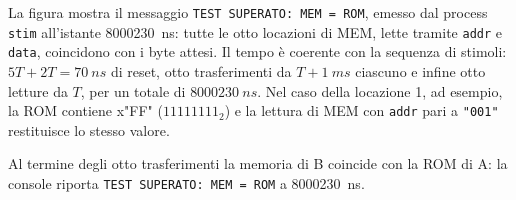 La figura mostra il messaggio \texttt{TEST SUPERATO: MEM = ROM}, emesso dal process \texttt{stim} all'istante \SI{8000230}{ns}: tutte le otto locazioni di MEM, lette tramite \texttt{addr} e \texttt{data}, coincidono con i byte attesi. Il tempo è coerente con la sequenza di stimoli: $5T + 2T = \SI{70}{ns}$ di reset, otto trasferimenti da $T + \SI{1}{ms}$ ciascuno e infine otto letture da $T$, per un totale di $\SI{8000230}{ns}$. Nel caso della locazione 1, ad esempio, la ROM contiene x"FF" ($11111111_2$) e la lettura di MEM con \texttt{addr} pari a \texttt{"001"} restituisce lo stesso valore.

\begin{risultato}
Al termine degli otto trasferimenti la memoria di B coincide con la ROM di A: la console riporta \texttt{TEST SUPERATO: MEM = ROM} a \SI{8000230}{ns}.
\end{risultato}
